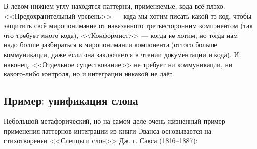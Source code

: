 \documentclass[a5paper]{article}
\begin{document}
В левом нижнем углу находятся паттерны, применяемые, кода всё плохо. <<Предохранительный уровень>> --- кода мы хотим писать какой-то код, чтобы защитить своё миропонимание от навязанного третьесторонним компонентом (так что требует много кода), <<Конформист>> --- когда не хотим, но тогда нам надо болше разбираться в миропонимании компонента (оттого больше коммуникации, даже если она заключается в чтении документации и кода). И наконец, <<Отдельное существование>> не требует ни коммуникации, ни какого-либо контроля, но и интеграции никакой не даёт.

\subsection{Пример: унификация слона}

Небольшой метафорический, но на самом деле очень жизненный пример применения паттернов интеграции из книги Эванса основывается на стихотворении <<Слепцы и слон>> Дж. г. Сакса (1816--1887):
\end{document}
